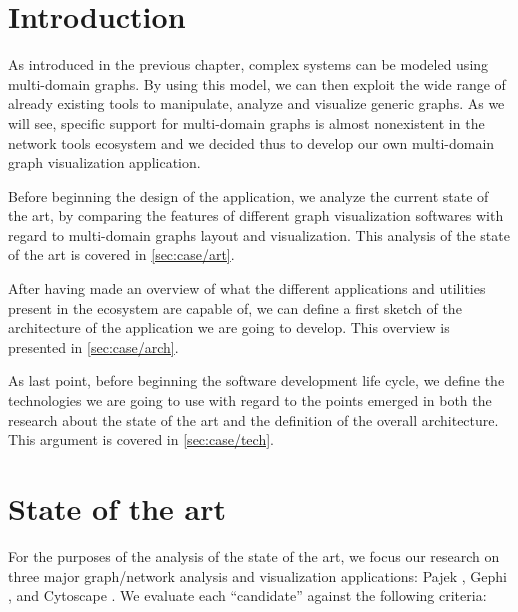 
\section{Introduction}

As introduced in the previous chapter, complex systems can be modeled using multi-domain graphs. By using this model, we can then exploit the wide range of already existing tools to manipulate, analyze and visualize generic graphs. As we will see, specific support for multi-domain graphs is almost nonexistent in the network tools ecosystem and we decided thus to develop our own multi-domain graph visualization application.

Before beginning the design of the application, we analyze the current state of the art, by comparing the features of different graph visualization softwares with regard to multi-domain graphs layout and visualization. This analysis of the state of the art is covered in \vref{sec:case/art}.

After having made an overview of what the different applications and utilities present in the ecosystem are capable of, we can define a first sketch of the architecture of the application we are going to develop. This overview is presented in \vref{sec:case/arch}.

As last point, before beginning the software development life cycle, we define the technologies we are going to use with regard to the points emerged in both the research about the state of the art and the definition of the overall architecture. This argument is covered in \vref{sec:case/tech}.

\section{State of the art}
\label{sec:case/art}

For the purposes of the analysis of the state of the art, we focus our research on three major graph/network analysis and visualization applications: Pajek \cite{pajek}, Gephi \cite{gephi}, and Cytoscape \cite{cytoscape}. We evaluate each ``candidate'' against the following criteria:

